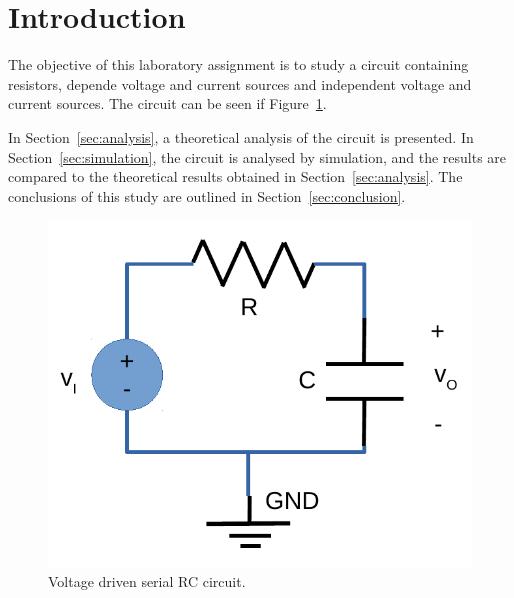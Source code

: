 \section{Introduction}
\label{sec:introduction}

The objective of this laboratory assignment is to study a circuit containing resistors, depende voltage and current sources and independent voltage and current sources. The circuit can be seen if Figure~\ref{fig:rc}.


In Section~\ref{sec:analysis}, a theoretical analysis of the circuit is
presented. In Section~\ref{sec:simulation}, the circuit is analysed by
simulation, and the results are compared to the theoretical results obtained in
Section~\ref{sec:analysis}. The conclusions of this study are outlined in
Section~\ref{sec:conclusion}.

\begin{figure}[h] \centering
\includegraphics[width=0.4\linewidth]{rc.pdf}
\caption{Voltage driven serial RC circuit.}
\label{fig:rc}
\end{figure}

